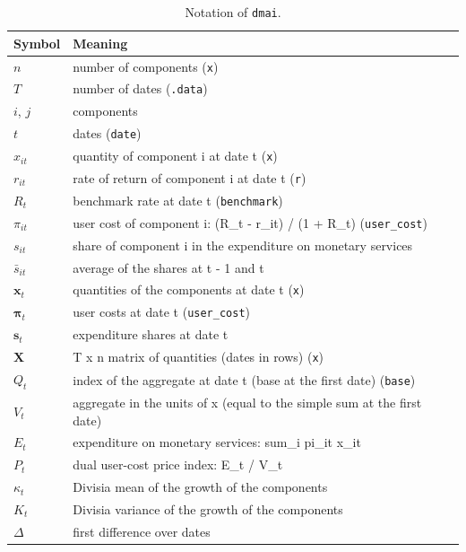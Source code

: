 \begin{longtable}{>{\raggedright\arraybackslash}p{}>{\raggedright\arraybackslash}p{}}
\caption{Notation of \texttt{dmai}.}\\
\toprule
Symbol & Meaning\\
\midrule
\endhead
$n$ & number of components (\texttt{x})\\
$T$ & number of dates (\texttt{.data})\\
$i$, $j$ & components\\
$t$ & dates (\texttt{date})\\
$x_{it}$ & quantity of component i at date t (\texttt{x})\\
$r_{it}$ & rate of return of component i at date t (\texttt{r})\\
$R_t$ & benchmark rate at date t (\texttt{benchmark})\\
$\pi_{it}$ & user cost of component i: (R_t - r_it) / (1 + R_t) (\texttt{user\_cost})\\
$s_{it}$ & share of component i in the expenditure on monetary services\\
$\bar{s}_{it}$ & average of the shares at t - 1 and t\\
$\mathbf{x}_t$ & quantities of the components at date t (\texttt{x})\\
$\boldsymbol{\pi}_t$ & user costs at date t (\texttt{user\_cost})\\
$\mathbf{s}_t$ & expenditure shares at date t\\
$\mathbf{X}$ & T x n matrix of quantities (dates in rows) (\texttt{x})\\
$Q_t$ & index of the aggregate at date t (base at the first date) (\texttt{base})\\
$V_t$ & aggregate in the units of x (equal to the simple sum at the first date)\\
$E_t$ & expenditure on monetary services: sum_i pi_it x_it\\
$P_t$ & dual user-cost price index: E_t / V_t\\
$\kappa_t$ & Divisia mean of the growth of the components\\
$K_t$ & Divisia variance of the growth of the components\\
$\Delta$ & first difference over dates\\
\bottomrule
\end{longtable}
